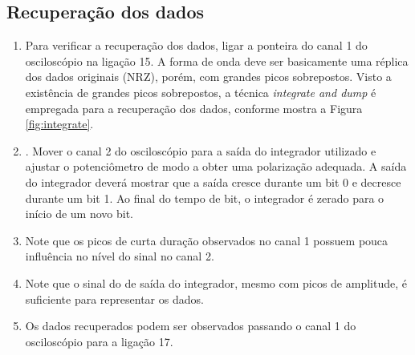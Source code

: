         \subsection{Recuperação dos dados}
            \begin{enumerate}
                \item Para verificar a recuperação dos dados, ligar a ponteira do canal 1 do osciloscópio na ligação 15. A forma de onda deve ser basicamente uma réplica dos dados originais (NRZ), porém, com grandes picos sobrepostos. Visto a existência de grandes picos sobrepostos, a técnica \textit{integrate and dump} é empregada para a recuperação dos dados, conforme mostra a Figura \ref{fig:integrate}.  
                
                \item. Mover o canal 2 do osciloscópio para a saída do integrador utilizado e ajustar o potenciômetro de modo a obter uma polarização adequada. A saída do integrador deverá mostrar que a saída cresce durante um bit 0 e decresce
                durante um bit 1. Ao final do tempo de bit, o integrador é zerado para o início de um novo bit.
                
                \item Note que os picos de curta duração observados no canal 1 possuem pouca influência no nível do sinal no canal 2.
                
                \item Note que o sinal do de saída do integrador, mesmo com picos de amplitude, é suficiente para representar os dados.
                
                \item Os dados recuperados podem ser observados passando o canal 1 do osciloscópio para a ligação 17.
            \end{enumerate}
            
            
         